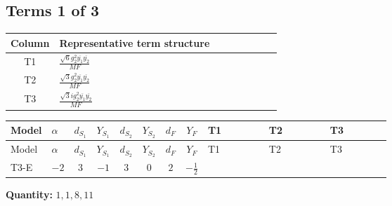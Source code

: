\documentclass[8pt]{article}
\begin{document}
\begin{landscape}
\subsection*{Terms 1 of 3}
\begin{center}
\begin{tabular}{@{}c >{\raggedright\arraybackslash}p{0.82\linewidth}@{}}
\toprule
Column & Representative term structure \\
\midrule
T1 & \(\displaystyle \frac{\sqrt{6} g_{2}^{2} \overline{y_{1}} \overline{y_{2}}}{MF}\) \\
\midrule
T2 & \(\displaystyle \frac{\sqrt{3} g_{2}^{2} \overline{y_{1}} \overline{y_{2}}}{MF}\) \\
\midrule
T3 & \(\displaystyle \frac{\sqrt{3} i g_{2}^{2} \overline{y_{1}} \overline{y_{2}}}{MF}\) \\
\midrule
\bottomrule
\end{tabular}
\end{center}
\smallskip
\tiny
\begin{longtable}{@{}llcccccc >{\raggedright\arraybackslash}p{0.21\linewidth} >{\raggedright\arraybackslash}p{0.21\linewidth} >{\raggedright\arraybackslash}p{0.21\linewidth}@{}}
\toprule
Model & $\alpha$ & $d_{S_1}$ & $Y_{S_1}$ & $d_{S_2}$ & $Y_{S_2}$ & $d_F$ & $Y_F$ & T1 & T2 & T3 \\
\midrule
\endfirsthead
\toprule
Model & $\alpha$ & $d_{S_1}$ & $Y_{S_1}$ & $d_{S_2}$ & $Y_{S_2}$ & $d_F$ & $Y_F$ & T1 & T2 & T3 \\
\midrule
\endhead
T3-E & $-2$ & $3$ & $-1$ & $3$ & $0$ & $2$ & $-\frac{1}{2}$ & \scriptsize\adjustbox{max width=\linewidth}{$\begin{gathered} \frac{\sqrt{6} g_{2}^{2} \overline{y_{1}} \overline{y_{2}}}{3 MF}\end{gathered}$} & \scriptsize\adjustbox{max width=\linewidth}{$\begin{gathered} \frac{\sqrt{3} g_{2}^{2} \overline{y_{1}} \overline{y_{2}}}{6 MF}\end{gathered}$} & \scriptsize\adjustbox{max width=\linewidth}{$\begin{gathered} - \frac{49 \sqrt{3} i g_{2}^{2} \overline{y_{1}} \overline{y_{2}}}{24 MF}\end{gathered}$} \\
\midrule
\bottomrule
\end{longtable}
\clearpage
\noindent\textbf{Quantity: }$\mathrm{1,1,8,11}$\par\smallskip

\end{landscape}
\end{document}
